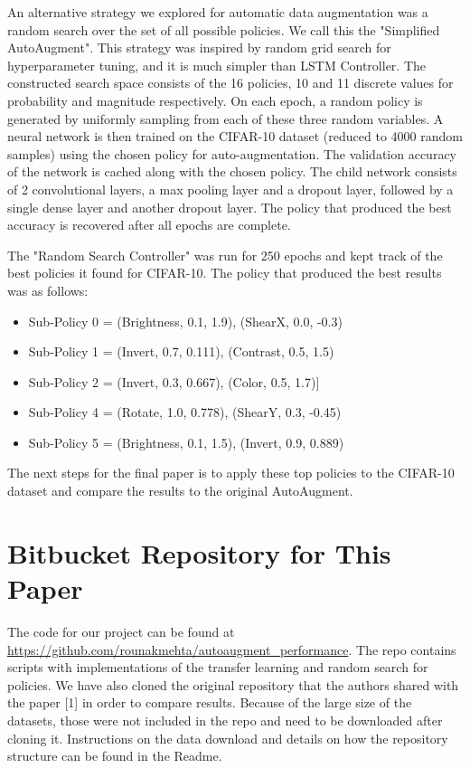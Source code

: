 \documentclass[10pt,twocolumn,letterpaper]{article}
\begin{document}
An alternative strategy we explored for automatic data augmentation was a random search over the set of all possible policies. We call this the "Simplified AutoAugment".  This strategy was inspired by random grid search for hyperparameter tuning, and it is much simpler than LSTM Controller. The constructed search space consists of the 16 policies, 10 and 11 discrete values for probability and magnitude respectively. On each epoch, a random policy is generated by uniformly sampling from each of these three random variables. A neural network is then trained on the CIFAR-10 dataset (reduced to 4000 random samples) using the chosen policy for auto-augmentation. The validation accuracy of the network is cached along with the chosen policy. The child network consists of 2 convolutional layers, a max pooling layer and a dropout layer, followed by a single dense layer and another dropout layer. The policy that produced the best accuracy is recovered after all epochs are complete.

The "Random Search Controller" was run for 250 epochs and kept track of the best policies it found for CIFAR-10. The policy that produced the best results was as follows:

\begin{itemize}
  \item Sub-Policy 0 = (Brightness, 0.1, 1.9), (ShearX, 0.0, -0.3)
  \item Sub-Policy 1 = (Invert, 0.7, 0.111), (Contrast, 0.5, 1.5)
  \item Sub-Policy 2 = (Invert, 0.3, 0.667), (Color, 0.5, 1.7)]
  \item Sub-Policy 4 = (Rotate, 1.0, 0.778), (ShearY, 0.3, -0.45)
  \item Sub-Policy 5 = (Brightness, 0.1, 1.5), (Invert, 0.9, 0.889)
 
\end{itemize}

The next steps for the final paper is to apply these top policies to the CIFAR-10 dataset and compare the results to the original AutoAugment.


\section{Bitbucket Repository for This Paper}

The code for our project can be found at \url{https://github.com/rounakmehta/autoaugment_performance}. The repo contains scripts with implementations of the transfer learning and random search for policies. We have also cloned the original repository that the authors shared with the paper [1] in order to compare results. Because of the large size of the datasets, those were not included in the repo and need to be downloaded after cloning it. Instructions on the data download and details on how the repository structure can be found in the Readme.  
\end{document}
